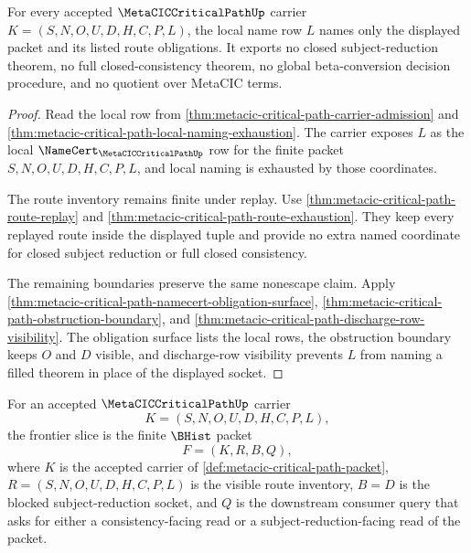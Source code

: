 \begin{theorem}
\label{thm:metacic-critical-path-local-name-nonescape}
For every accepted $\MetaCICCriticalPathUp$ carrier $K=(S,N,O,U,D,H,C,P,L)$, the local name row $L$ names only the displayed packet and its listed route obligations. It exports no closed subject-reduction theorem, no full closed-consistency theorem, no global beta-conversion decision procedure, and no quotient over MetaCIC terms.
\end{theorem}
\begin{proof}
Read the local row from \autoref{thm:metacic-critical-path-carrier-admission} and \autoref{thm:metacic-critical-path-local-naming-exhaustion}. The carrier exposes $L$ as the local $\NameCert_{\MetaCICCriticalPathUp}$ row for the finite packet $S,N,O,U,D,H,C,P,L$, and local naming is exhausted by those coordinates.

The route inventory remains finite under replay. Use \autoref{thm:metacic-critical-path-route-replay} and \autoref{thm:metacic-critical-path-route-exhaustion}. They keep every replayed route inside the displayed tuple and provide no extra named coordinate for closed subject reduction or full closed consistency.

The remaining boundaries preserve the same nonescape claim. Apply \autoref{thm:metacic-critical-path-namecert-obligation-surface}, \autoref{thm:metacic-critical-path-obstruction-boundary}, and \autoref{thm:metacic-critical-path-discharge-row-visibility}. The obligation surface lists the local rows, the obstruction boundary keeps $O$ and $D$ visible, and discharge-row visibility prevents $L$ from naming a filled theorem in place of the displayed socket.
\end{proof}

\begin{definition}
\label{def:metacic-critical-path-frontier-slice}
For an accepted $\MetaCICCriticalPathUp$ carrier
$$
K=(S,N,O,U,D,H,C,P,L),
$$
the frontier slice is the finite $\BHist$ packet
$$
F=(K,R,B,Q),
$$
where $K$ is the accepted carrier of \autoref{def:metacic-critical-path-packet}, $R=(S,N,O,U,D,H,C,P,L)$ is the visible route inventory, $B=D$ is the blocked subject-reduction socket, and $Q$ is the downstream consumer query that asks for either a consistency-facing read or a subject-reduction-facing read of the packet.
\end{definition}

